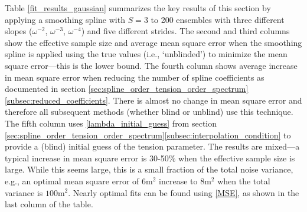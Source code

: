 \documentclass{ametsoc}
\begin{document}
Table \ref{fit_results_gaussian} summarizes the key results of this section by applying a smoothing spline with $S=3$ to 200 ensembles with three different slopes ($\omega^{-2}$, $\omega^{-3}$, $\omega^{-4}$) and five different strides. The second and third columns show the effective sample size and average mean square error when the smoothing spline is applied using the true values (i.e., `unblinded') to minimize the mean square error---this is the lower bound. The fourth column shows average increase in mean square error when reducing the number of spline coefficients as documented in section \ref{sec:spline_order_tension_order_spectrum}\ref{subsec:reduced_coefficients}. There is almost no change in mean square error and therefore all subsequent methods (whether blind or unblind) use this technique. The fifth column uses \eqref{lambda_initial_guess} from section \ref{sec:spline_order_tension_order_spectrum}\ref{subsec:interpolation_condition} to provide a (blind) initial guess of the tension parameter. The results are mixed---a typical increase in mean square error is 30-50\% when the effective sample size is large. While this seems large, this is a small fraction of the total noise variance, e.g., an optimal mean square error of $6$m$^2$ increase to $8$m$^2$ when the total variance is $100$m$^2$. Nearly optimal fits can be found using \eqref{MSE}, as shown in the last column of the table.

\end{document}
